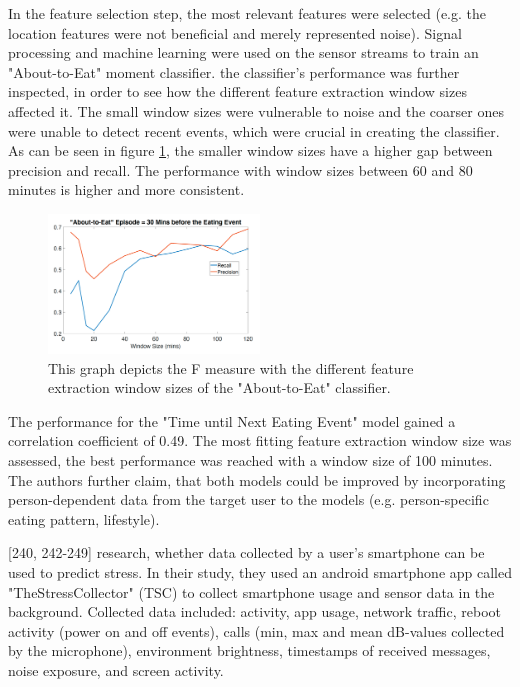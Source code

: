 In the feature selection step, the most relevant features were selected (e.g. the location features were not beneficial and merely represented noise). Signal processing and machine learning were used on the sensor streams to train an "About-to-Eat" moment classifier. the classifier's performance was further inspected, in order to see how the different feature extraction window sizes affected it. The small window sizes were vulnerable to noise and the coarser ones were unable to detect recent events, which were crucial in creating the classifier. As can be seen in figure \ref{figure:windowSize}, the smaller window sizes have a higher gap between precision and recall. The performance with window sizes between 60 and 80 minutes is higher and more consistent.

\begin{figure}[h]
  \centering
  \includegraphics[width=0.5\textwidth]{./images/windowSizePerformance.png}
  \caption{This graph depicts the F measure with the different feature extraction window sizes of the "About-to-Eat" classifier.}
  \label{figure:windowSize}
\end{figure}

The performance for the "Time until Next Eating Event" model gained a correlation coefficient of 0.49. The most fitting feature extraction window size was assessed, the best performance was reached with a window size of 100 minutes. The authors further claim, that both models could be improved by incorporating person-dependent data from the target user to the models (e.g. person-specific eating pattern, lifestyle).



\textcite{SmartphoneBasedStressPrediction2015}[240, 242-249] research, whether data collected by a user's smartphone can be used to predict stress. In their study, they used an android smartphone app called "TheStressCollector" (TSC) to collect smartphone usage and sensor data in the background. Collected data included: activity, app usage, network traffic, reboot activity (power on and off events), calls (min, max and mean dB-values collected by the microphone), environment brightness, timestamps of received messages, noise exposure, and screen activity.

